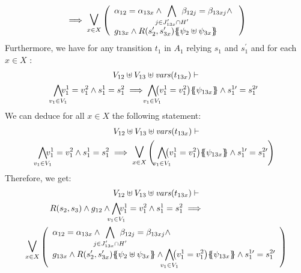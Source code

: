 \documentclass[runningheads]{llncs}
\begin{document}
\begin{enumerate}
\begin{multline*}
\implies\operatorname*{\bigsymb{\bigvee}}_{x \in X} \mpar{\everymath{\displaystyle}
\begin{array}{l}
			\alpha_{12} = \alpha_{13x} \wedge \bigwedge_\subbox{j \in J'_{13x} \cap H'} \beta_{12j} = \beta_{13xj} \nwedge\\
			 g_{13x} \wedge R\mpar{s'_2, s'_{3x}}\psubst{\psi_2 \uplus \psi_{3x}}
		\end{array}} 
\end{multline*}	
Furthermore, we have for any transition $t_1$ in $A_1$ relying $s_1$ and $s^{\prime}_1$ and for each $x \in X$ :
\begin{multline*}
V_{12} \uplus V_{13}  \uplus \fvars{t_{13x}} \vdash\\
\bigwedge_\subbox{v_1\in V_1}\!\! v^1_1=v^2_1  \wedge s^1_1 = s^2_1 \implies \bigwedge_\subbox{v_1\in V_1}\!\! \mpar{v^1_1=v^2_1} \psubst{\psi_{13x}} \wedge s^{1\prime}_1 = s^{2\prime}_1 
 \end{multline*}	
We can deduce for all  $x \in X$ the following statement:
\begin{multline*}
V_{12} \uplus V_{13}  \uplus \fvars{t_{13x}} \vdash\\
\bigwedge_\subbox{v_1\in V_1}\!\! v^1_1=v^2_1  \wedge s^1_1 = s^2_1 \implies \operatorname*{\bigsymb{\bigvee}}_{x \in X} \mpar{\,\,\everymath{\displaystyle}\bigwedge_\subbox{v_1\in V_1}\!\! \mpar{v^1_1=v^2_1} \psubst{\psi_{13x}} \wedge s^{1\prime}_1 = s^{2\prime}_1 }
 \end{multline*}	
Therefore, we get:
\begin{multline*}
V_{12} \uplus V_{13} \uplus \fvars{t_{13x}} \vdash\\ R\mpar{s_2, s_3} \wedge g_{12} \wedge \bigwedge_\subbox{v_1\in V_1}\!\! v^1_1=v^2_1 \wedge s^1_1 = s^2_1
\implies \hspace{7em} \\ \operatorname*{\bigsymb{\bigvee}}_{x \in X} \mpar{\everymath{\displaystyle}
\begin{array}{l}
			\alpha_{12} = \alpha_{13x} \wedge \bigwedge_\subbox{j \in J'_{13x} \cap H'} \beta_{12j} = \beta_{13xj} \nwedge\\
			 g_{13x} \wedge R\mpar{s'_2, s'_{3x}}\psubst{\psi_2 \uplus \psi_{3x}} \wedge\bigwedge_\subbox{v_1\in V_1}\!\! \mpar{v^1_1=v^2_1} \psubst{\psi_{13x}} \wedge s^{1\prime}_1 = s^{2\prime}_1
		\end{array}   } 
		\end{multline*}	
		

\end{enumerate}
\end{document}
